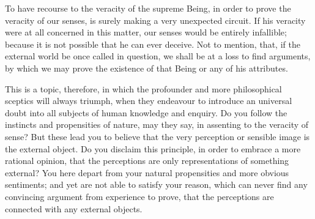 \documentclass[]{article}
\begin{document}
\begin{sectionbody}
\humeparagraph  To have recourse to the veracity of the supreme Being, in order to prove the veracity of our senses, is surely making a very unexpected circuit. If his veracity were at all concerned in this matter, our senses would be entirely infallible; because it is not possible that he can ever deceive. Not to mention, that, if the external world be once called in question, we shall be at a loss to find arguments, by which we may prove the existence of that Being or any of his attributes.

\humeparagraph  This is a topic, therefore, in which the profounder and more philosophical sceptics will always triumph, when they endeavour to introduce an universal doubt into all subjects of human knowledge and enquiry. Do you follow the instincts and propensities of nature, may they say, in assenting to the veracity of sense? But these lead you to believe that the very perception or sensible image is the external object. Do you disclaim this principle, in order to embrace a more rational opinion, that the perceptions are only representations of something external? You here depart from your natural propensities and more obvious sentiments; and yet are not able to satisfy your reason, which can never find any convincing argument from experience to prove, that the perceptions are connected with any external objects.


\end{sectionbody}
\end{document}
